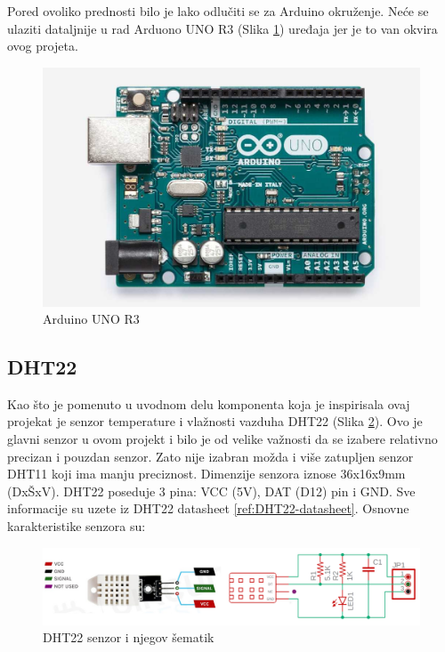\documentclass[a4paper, 12pt]{article}
\begin{document}
\vspace{10pt}

Pored ovoliko prednosti bilo je lako odlučiti se za Arduino okruženje. Neće se ulaziti dataljnije u rad Arduono UNO R3 (Slika \ref{ref:Arduino}) uređaja jer je to van okvira ovog projeta. 

\begin{figure}[H]
\centering
\includegraphics[scale=0.17]{images/Arduino UNO R3}
\caption{Arduino UNO R3} \label{ref:Arduino}
\end{figure}

\pagebreak


	\subsection{DHT22}

\vspace{10pt}

Kao što je pomenuto u uvodnom delu komponenta koja je inspirisala ovaj projekat je senzor temperature i vlažnosti vazduha DHT22 (Slika \ref{ref:dht22pinssch}). Ovo je glavni senzor u ovom projekt i bilo je od velike važnosti da se izabere relativno precizan i pouzdan senzor. Zato nije izabran možda i više zatupljen senzor DHT11 koji ima manju preciznost. Dimenzije senzora iznose 36x16x9mm (DxŠxV). DHT22 poseduje 3 pina: VCC (5V), DAT (D12) pin i GND. Sve informacije su uzete iz DHT22 datasheet \ref{ref:DHT22-datasheet}. Osnovne karakteristike senzora su:

\begin{figure}[H]
\centering
\includegraphics[scale=0.4]{images/dht22pinssch}
\caption{DHT22 senzor i njegov šematik} \label{ref:dht22pinssch}
\end{figure}
\end{document}
